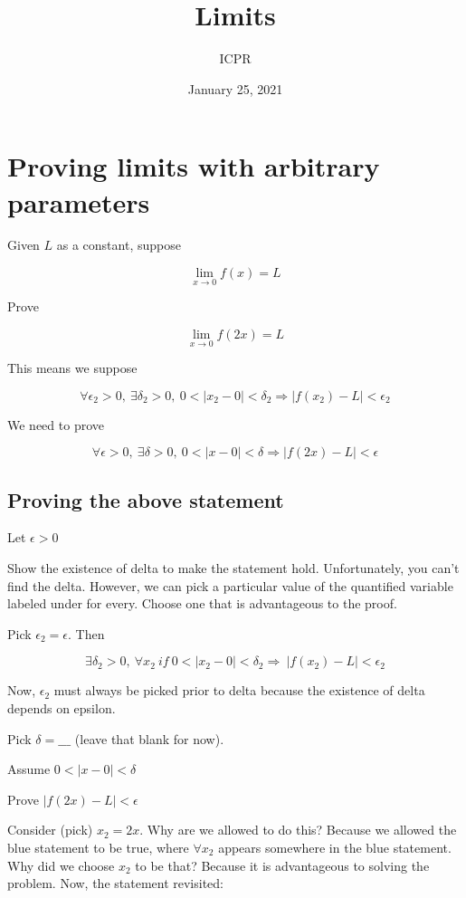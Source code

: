 \documentclass[12pt]{article}
\title{Limits}
\author{ICPR}
\date{January 25, 2021}
\theoremstyle{plain}
\theoremstyle{remark}
\theoremstyle{definition}
\begin{document}
\maketitle

{
\setcounter{tocdepth}{3}
\tableofcontents
}

\section{Proving limits with arbitrary
parameters}

Given \(L\) as a constant, suppose

\[\lim_{x \rightarrow 0}{f(x)} = L\]

Prove

\[\lim_{x \rightarrow 0}{f(2x)} = L\]

This means we suppose

\[\forall\epsilon_{2} > 0,\ \exists\delta_{2} > 0,\ 0 < \left| x_{2} - 0 \right| < \delta_{2} \Rightarrow \left| f\left( x_{2} \right) - L \right| < \epsilon_{2}\]

We need to prove

\[\forall\epsilon > 0,\ \exists\delta > 0,\ 0 < |x - 0| < \delta \Rightarrow \left| f(2x) - L \right| < \epsilon\]


\subsection{Proving the above
statement}

Let \(\epsilon > 0\)

Show the existence of delta to make the statement hold. Unfortunately,
you can't find the delta. However, we can pick a particular value of the
quantified variable labeled under for every. Choose one that is
advantageous to the proof.

Pick \(\epsilon_{2} = \epsilon\). Then

\[\exists\delta_{2} > 0,\ \forall x_{2}\ if\ 0 < \left| x_{2} - 0 \right| < \delta_{2} \Rightarrow \ \left| f\left( x_{2} \right) - L \right| < \epsilon_{2}\]

Now, \(\epsilon_{2}\) must always be picked prior to delta because the
existence of delta depends on epsilon.

Pick \(\delta = \_\_\_\) (leave that blank for now).

Assume \(0 < |x - 0| < \delta\)

Prove \(\left| f(2x) - L \right| < \epsilon\)

Consider (pick) \(x_{2} = 2x\). Why are we allowed to do this? Because
we allowed the blue statement to be true, where \(\forall x_{2}\)
appears somewhere in the blue statement. Why did we choose \(x_{2}\) to
be that? Because it is advantageous to solving the problem. Now, the
statement revisited:
\end{document}
